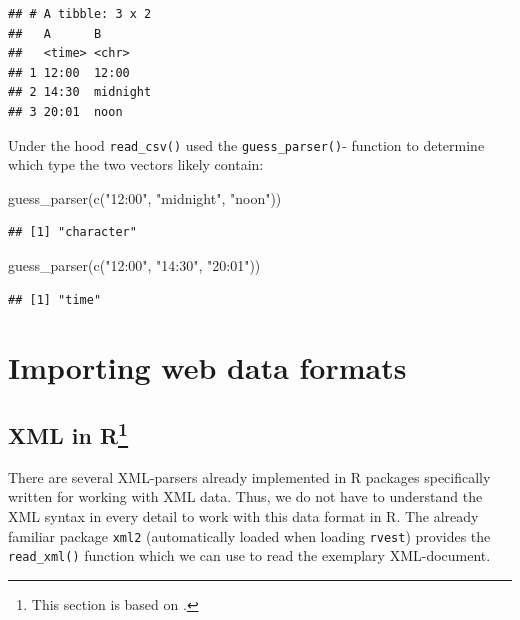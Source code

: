 \documentclass[
  12pt,
]{style/krantz}
\newenvironment{Shaded}{\begin{snugshade}}{\end{snugshade}}
\newcommand{\FunctionTok}[1]{\textcolor[rgb]{0.00,0.00,0.00}{#1}}
\newcommand{\NormalTok}[1]{#1}
\newcommand{\StringTok}[1]{\textcolor[rgb]{0.31,0.60,0.02}{#1}}
\begin{document}
\begin{verbatim}
## # A tibble: 3 x 2
##   A      B       
##   <time> <chr>   
## 1 12:00  12:00   
## 2 14:30  midnight
## 3 20:01  noon
\end{verbatim}

Under the hood \texttt{read\_csv()} used the \texttt{guess\_parser()}- function to determine which type the two vectors likely contain:

\begin{Shaded}
\begin{Highlighting}[]
\FunctionTok{guess\_parser}\NormalTok{(}\FunctionTok{c}\NormalTok{(}\StringTok{"12:00"}\NormalTok{, }\StringTok{"midnight"}\NormalTok{, }\StringTok{"noon"}\NormalTok{))}
\end{Highlighting}
\end{Shaded}

\begin{verbatim}
## [1] "character"
\end{verbatim}

\begin{Shaded}
\begin{Highlighting}[]
\FunctionTok{guess\_parser}\NormalTok{(}\FunctionTok{c}\NormalTok{(}\StringTok{"12:00"}\NormalTok{, }\StringTok{"14:30"}\NormalTok{, }\StringTok{"20:01"}\NormalTok{))}
\end{Highlighting}
\end{Shaded}

\begin{verbatim}
## [1] "time"
\end{verbatim}

\hypertarget{importing-web-data-formats}{%
\section{Importing web data formats}\label{importing-web-data-formats}}

\hypertarget{xml-in-r}{%
\subsection[XML in R]{\texorpdfstring{XML in R\footnote{This section is based on \citet{umatter_2018b}.}}{XML in R}}\label{xml-in-r}}

There are several XML-parsers already implemented in R packages specifically written for working with XML data. Thus, we do not have to understand the XML syntax in every detail to work with this data format in R. The already familiar package \texttt{xml2} (automatically loaded when loading \texttt{rvest}) provides the \texttt{read\_xml()} function which we can use to read the exemplary XML-document.
\end{document}
